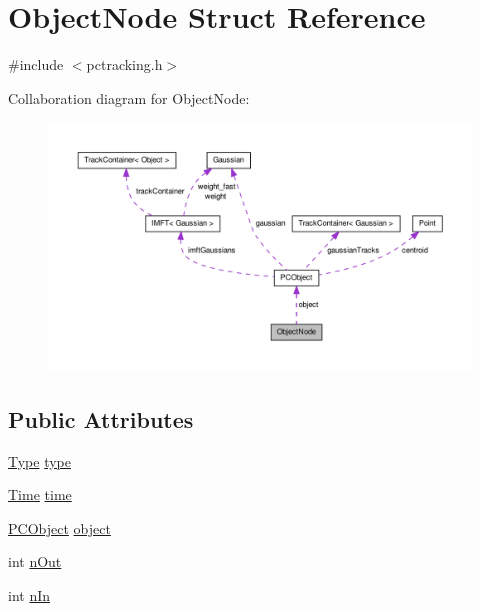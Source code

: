 \hypertarget{struct_object_node}{\section{\-Object\-Node \-Struct \-Reference}
\label{struct_object_node}
}


{\ttfamily \#include $<$pctracking.\-h$>$}



\-Collaboration diagram for \-Object\-Node\-:
\nopagebreak
\begin{figure}[H]
\begin{center}
\leavevmode
\includegraphics[width=350pt]{struct_object_node__coll__graph}
\end{center}
\end{figure}
\subsection*{\-Public \-Attributes}
\begin{DoxyCompactItemize}
\item 
\hyperlink{pctracking_8h_a1d1cfd8ffb84e947f82999c682b666a7}{\-Type} \hyperlink{struct_object_node_a5afed3ebe97aa3a945f29934532b5154}{type}
\item 
\hyperlink{pctracking_8h_a80b0d67eccd8a722b335bc1c9679a2f7}{\-Time} \hyperlink{struct_object_node_a436ab00d9951d27c758081bad6c9d690}{time}
\item 
\hyperlink{class_p_c_object}{\-P\-C\-Object} \hyperlink{struct_object_node_a9e1e36a7fe384526cb99ceddfd86e598}{object}
\item 
int \hyperlink{struct_object_node_a07820c0eda571bedfac7a04171c4786e}{n\-Out}
\item 
int \hyperlink{struct_object_node_a10f5902c1668612e39b46150894bd0f9}{n\-In}
\end{DoxyCompactItemize}


